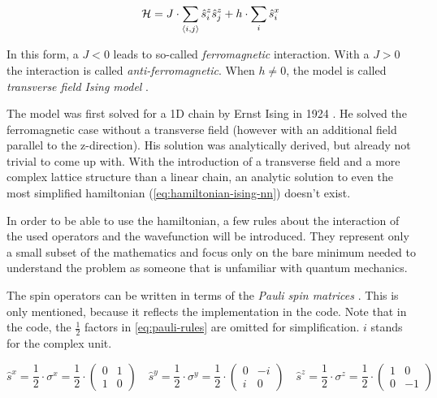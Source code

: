 \begin{equation}
    \label{eq:hamiltonian-ising-nn}
    \mathcal{H} =  J \cdot \sum\limits_{\langle i, j \rangle} \hat{s}^z_i \hat{s}^z_j + h \cdot \sum\limits_{i} \hat{s}^x_i
\end{equation}

In this form, a $J < 0$ leads to so-called \emph{ferromagnetic} interaction. With a $J > 0$ the interaction is called \emph{anti-ferromagnetic}. When $h \neq 0$, the model is called \emph{transverse field Ising model} \cite{isingBook}.

The model was first solved for a 1D chain by Ernst Ising in 1924 \cite*[]{isingFerromagnetismn}. He solved the ferromagnetic case without a transverse field (however with an additional field parallel to the z-direction). His solution was analytically derived, but already not trivial to come up with.
With the introduction of a transverse field and a more complex lattice structure than a linear chain, an analytic solution to even the most simplified hamiltonian (\autoref{eq:hamiltonian-ising-nn}) doesn't exist.

In order to be able to use the hamiltonian, a few rules about the interaction of the used operators and the wavefunction will be introduced. They represent only a small subset of the mathematics and focus only on the bare minimum needed to understand the problem as someone that is unfamiliar with quantum mechanics. 

The spin operators can be written in terms of the \emph{Pauli spin matrices} \cite{schwablQM}. This is only mentioned, because it reflects the implementation in the code. Note that in the code, the $\frac{1}{2}$ factors in \autoref{eq:pauli-rules} are omitted for simplification. $i$ stands for the complex unit.

\begin{equation}
    \label{eq:pauli-rules}
    \hat{s}^x = \frac{1}{2} \cdot \sigma^x = \frac{1}{2} \cdot \left(\begin{matrix}
        0& 1 \\
        1& 0
    \end{matrix}\right) \quad
    \hat{s}^y = \frac{1}{2} \cdot \sigma^y = \frac{1}{2} \cdot \left(\begin{matrix}
        0& -i \\
        i& 0
    \end{matrix}\right) \quad
    \hat{s}^z = \frac{1}{2} \cdot \sigma^z = \frac{1}{2} \cdot \left(\begin{matrix}
        1& 0 \\
        0& -1
    \end{matrix}\right)
\end{equation}

